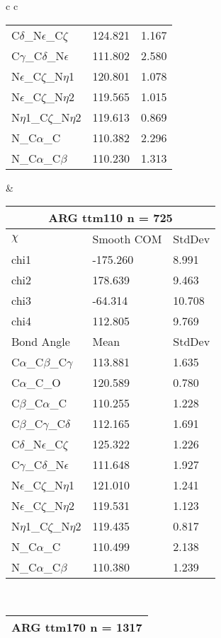 \begin{longtable}{ c c }
\begin{tabular}{ l l l }
  C$\delta$\_N$\epsilon$\_C$\zeta$ & 124.821 & 1.167\\
  C$\gamma$\_C$\delta$\_N$\epsilon$ & 111.802 & 2.580\\
  N$\epsilon$\_C$\zeta$\_N$\eta$1 & 120.801 & 1.078\\
  N$\epsilon$\_C$\zeta$\_N$\eta$2 & 119.565 & 1.015\\
  N$\eta$1\_C$\zeta$\_N$\eta$2 & 119.613 & 0.869\\
  N\_C$\alpha$\_C & 110.382 & 2.296\\
  N\_C$\alpha$\_C$\beta$ & 110.230 & 1.313\\
  \bottomrule
  \end{tabular}
  &
  \begin{tabular}{ l l l }
  \toprule
  \multicolumn{3}{c}{ARG \textbf{ttm110} n = 725} \\ \toprule
  $\chi$       & Smooth COM & StdDev \\ \midrule
  chi1 & -175.260 & 8.991 \\ 
  chi2 & 178.639 & 9.463 \\ 
  chi3 & -64.314 & 10.708 \\ 
  chi4 & 112.805 & 9.769 \\ \midrule
  Bond Angle   & Mean     & StdDev \\ \midrule
  C$\alpha$\_C$\beta$\_C$\gamma$ & 113.881 & 1.635\\
  C$\alpha$\_C\_O & 120.589 & 0.780\\
  C$\beta$\_C$\alpha$\_C & 110.255 & 1.228\\
  C$\beta$\_C$\gamma$\_C$\delta$ & 112.165 & 1.691\\
  C$\delta$\_N$\epsilon$\_C$\zeta$ & 125.322 & 1.226\\
  C$\gamma$\_C$\delta$\_N$\epsilon$ & 111.648 & 1.927\\
  N$\epsilon$\_C$\zeta$\_N$\eta$1 & 121.010 & 1.241\\
  N$\epsilon$\_C$\zeta$\_N$\eta$2 & 119.531 & 1.123\\
  N$\eta$1\_C$\zeta$\_N$\eta$2 & 119.435 & 0.817\\
  N\_C$\alpha$\_C & 110.499 & 2.138\\
  N\_C$\alpha$\_C$\beta$ & 110.380 & 1.239\\
  \bottomrule
  \end{tabular}
  \\
  \begin{tabular}{ l l l }
  \toprule
  \multicolumn{3}{c}{ARG \textbf{ttm170} n = 1317} \\ \toprule

\end{tabular}
\end{longtable}
